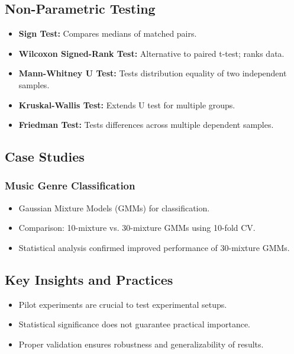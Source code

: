 \subsection{Non-Parametric Testing}
\begin{itemize}
    \item \textbf{Sign Test:} Compares medians of matched pairs.
    \item \textbf{Wilcoxon Signed-Rank Test:} Alternative to paired t-test; ranks data.
    \item \textbf{Mann-Whitney U Test:} Tests distribution equality of two independent samples.
    \item \textbf{Kruskal-Wallis Test:} Extends U test for multiple groups.
    \item \textbf{Friedman Test:} Tests differences across multiple dependent samples.
\end{itemize}

\subsection{Case Studies}
\subsubsection{Music Genre Classification}
\begin{itemize}
    \item Gaussian Mixture Models (GMMs) for classification.
    \item Comparison: 10-mixture vs. 30-mixture GMMs using 10-fold CV.
    \item Statistical analysis confirmed improved performance of 30-mixture GMMs.
\end{itemize}

\subsection{Key Insights and Practices}
\begin{itemize}
    \item Pilot experiments are crucial to test experimental setups.
    \item Statistical significance does not guarantee practical importance.
    \item Proper validation ensures robustness and generalizability of results.
\end{itemize}
